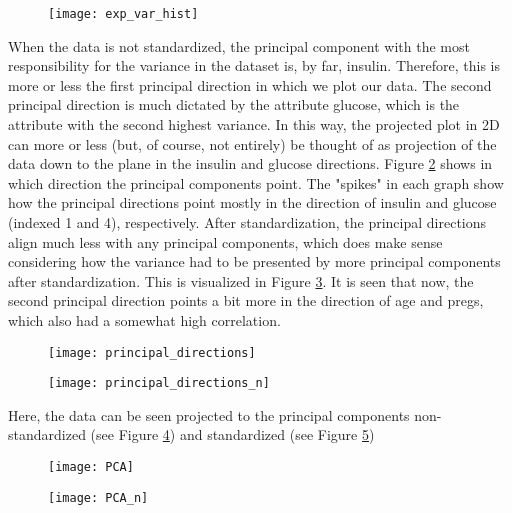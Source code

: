 \begin{figure}
  \centering{}
  \texttt{[image: exp\_var\_hist]}
  \label{fig:exp_var_hist}
\end{figure}

When the data is not standardized, the principal component with the most
responsibility for the variance in the dataset is, by far, insulin. Therefore,
this is more or less the first principal direction in which we plot our data. The second
principal direction is much dictated by the attribute glucose, which is the
attribute with the second highest variance. In this way, the projected plot in
2D can more or less (but, of course, not entirely) be thought of as
projection of the data down to the plane in the insulin and glucose directions.
Figure \ref{fig:principal_directions} shows in which direction the principal components point. The "spikes"
in each graph show how the principal directions point mostly in the direction of
insulin and glucose (indexed 1 and 4), respectively. After standardization, the principal
directions align much less with any principal components, which does make sense
considering how the variance had to be presented by more principal components
after standardization. This is visualized in Figure \ref{fig:principal_directions_n}.
It is seen that now, the second principal direction points a bit more in the direction
of age and pregs, which also had a somewhat high correlation.

\begin{figure}
  \centering{}
  \texttt{[image: principal\_directions]}
  \label{fig:principal_directions}
\end{figure}

\begin{figure}
  \centering{}
  \texttt{[image: principal\_directions\_n]}
  \label{fig:principal_directions_n}
\end{figure}

Here, the data can be seen projected to the principal components non-standardized
(see Figure \ref{fig:PCA})
and standardized (see Figure \ref{fig:PCA_n})

\begin{figure}
  \centering{}
  \texttt{[image: PCA]}
  \label{fig:PCA}
\end{figure}

\begin{figure}
  \centering{}
  \texttt{[image: PCA\_n]}
  \label{fig:PCA_n}
\end{figure}

